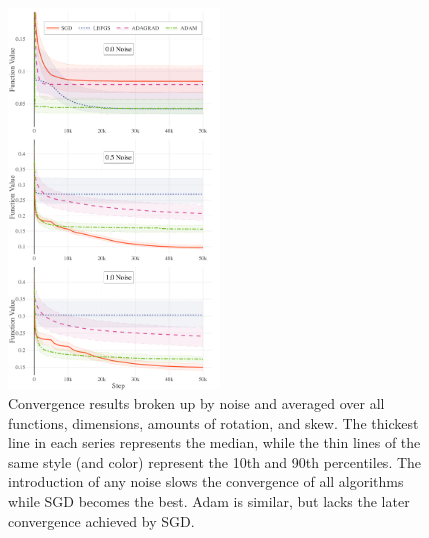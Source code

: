 \documentclass[letterpaper, 10 pt, conference]{IEEEtran}  %
\begin{document}
\begin{figure}
  \centering
  \includegraphics[width=0.5\textwidth]{Figures/final-noise}
  \caption{Convergence results broken up by noise and averaged over
    all functions, dimensions, amounts of rotation, and skew. The
    thickest line in each series represents the median, while the thin
    lines of the same style (and color) represent the 10th and 90th
    percentiles. The introduction of any noise slows the convergence
    of all algorithms while SGD becomes the best. Adam is similar, but
    lacks the later convergence achieved by SGD.}
  \label{fig:results-noise}
\end{figure}
\end{document}
